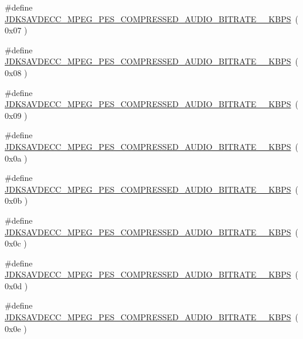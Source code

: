\begin{DoxyCompactItemize}
\#define \hyperlink{group__mpeg__pes__compressed__audio__bitrate_gab7a4f366e1fac62ee1bd10fd9baa08f0}{J\+D\+K\+S\+A\+V\+D\+E\+C\+C\+\_\+\+M\+P\+E\+G\+\_\+\+P\+E\+S\+\_\+\+C\+O\+M\+P\+R\+E\+S\+S\+E\+D\+\_\+\+A\+U\+D\+I\+O\+\_\+\+B\+I\+T\+R\+A\+T\+E\+\_\+\_\+\+K\+B\+PS}~( 0x07 )
\item 
\#define \hyperlink{group__mpeg__pes__compressed__audio__bitrate_ga82a6af5b709fa3df2a033ce376458dd7}{J\+D\+K\+S\+A\+V\+D\+E\+C\+C\+\_\+\+M\+P\+E\+G\+\_\+\+P\+E\+S\+\_\+\+C\+O\+M\+P\+R\+E\+S\+S\+E\+D\+\_\+\+A\+U\+D\+I\+O\+\_\+\+B\+I\+T\+R\+A\+T\+E\+\_\+\_\+\+K\+B\+PS}~( 0x08 )
\item 
\#define \hyperlink{group__mpeg__pes__compressed__audio__bitrate_ga9e6858c57f0dd8b792aa9a246322a5a7}{J\+D\+K\+S\+A\+V\+D\+E\+C\+C\+\_\+\+M\+P\+E\+G\+\_\+\+P\+E\+S\+\_\+\+C\+O\+M\+P\+R\+E\+S\+S\+E\+D\+\_\+\+A\+U\+D\+I\+O\+\_\+\+B\+I\+T\+R\+A\+T\+E\+\_\+\_\+\+K\+B\+PS}~( 0x09 )
\item 
\#define \hyperlink{group__mpeg__pes__compressed__audio__bitrate_ga8308b56b4a161ff567ee71a00e18e0ba}{J\+D\+K\+S\+A\+V\+D\+E\+C\+C\+\_\+\+M\+P\+E\+G\+\_\+\+P\+E\+S\+\_\+\+C\+O\+M\+P\+R\+E\+S\+S\+E\+D\+\_\+\+A\+U\+D\+I\+O\+\_\+\+B\+I\+T\+R\+A\+T\+E\+\_\+\_\+\+K\+B\+PS}~( 0x0a )
\item 
\#define \hyperlink{group__mpeg__pes__compressed__audio__bitrate_ga84706cd86bf0750147e4ae78a21be58f}{J\+D\+K\+S\+A\+V\+D\+E\+C\+C\+\_\+\+M\+P\+E\+G\+\_\+\+P\+E\+S\+\_\+\+C\+O\+M\+P\+R\+E\+S\+S\+E\+D\+\_\+\+A\+U\+D\+I\+O\+\_\+\+B\+I\+T\+R\+A\+T\+E\+\_\+\_\+\+K\+B\+PS}~( 0x0b )
\item 
\#define \hyperlink{group__mpeg__pes__compressed__audio__bitrate_ga2eafc3f2a60b46695c458e8b12a46cf6}{J\+D\+K\+S\+A\+V\+D\+E\+C\+C\+\_\+\+M\+P\+E\+G\+\_\+\+P\+E\+S\+\_\+\+C\+O\+M\+P\+R\+E\+S\+S\+E\+D\+\_\+\+A\+U\+D\+I\+O\+\_\+\+B\+I\+T\+R\+A\+T\+E\+\_\+\_\+\+K\+B\+PS}~( 0x0c )
\item 
\#define \hyperlink{group__mpeg__pes__compressed__audio__bitrate_gaecba814c47cbd4df7e5c3906b1cd7d2a}{J\+D\+K\+S\+A\+V\+D\+E\+C\+C\+\_\+\+M\+P\+E\+G\+\_\+\+P\+E\+S\+\_\+\+C\+O\+M\+P\+R\+E\+S\+S\+E\+D\+\_\+\+A\+U\+D\+I\+O\+\_\+\+B\+I\+T\+R\+A\+T\+E\+\_\+\_\+\+K\+B\+PS}~( 0x0d )
\item 
\#define \hyperlink{group__mpeg__pes__compressed__audio__bitrate_ga63ba8c68a09ac6b6297fe36c8d4579d3}{J\+D\+K\+S\+A\+V\+D\+E\+C\+C\+\_\+\+M\+P\+E\+G\+\_\+\+P\+E\+S\+\_\+\+C\+O\+M\+P\+R\+E\+S\+S\+E\+D\+\_\+\+A\+U\+D\+I\+O\+\_\+\+B\+I\+T\+R\+A\+T\+E\+\_\+\_\+\+K\+B\+PS}~( 0x0e )
\item 

\end{DoxyCompactItemize}
